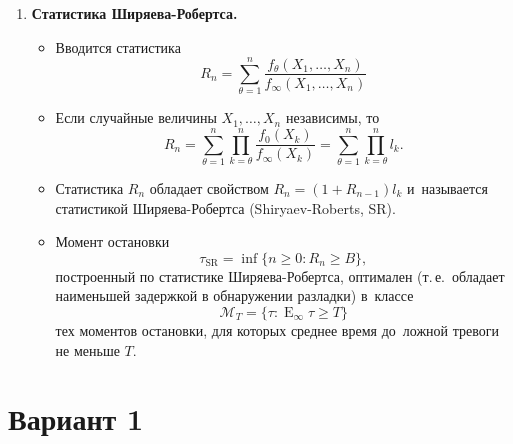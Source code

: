 \documentclass[a4paper,14pt]{extreport}
\renewcommand{\=}[1]{\stackrel{#1}{=}} %
\newcommand{\Expect}{\mathop{{}\mathrm{E}}}
\newenvironment{boenumerate}
  {\begin{enumerate}\renewcommand\labelenumi{\textbf{\theenumi.}}}
  {\end{enumerate}}
\begin{document}
\begin{boenumerate}
    \item \textbf{Статистика Ширяева-Робертса.}
    \begin{itemize}
    \item Вводится статистика
    \begin{equation*}
    R_n = \sum\limits_{\theta = 1}^{n} \frac{f_{\theta}(X_1, \ldots, X_n)}{f_{\infty}(X_1, \ldots, X_n)}
    \end{equation*}
    \item Если случайные величины $X_1, \ldots, X_n$ независимы, то
    \begin{equation*}
    R_n = \sum\limits_{\theta = 1}^{n} \prod\limits_{k=\theta}^{n}
        \frac{f_{0}(X_k)}{f_{\infty}(X_k)} =
            \sum\limits_{\theta = 1}^{n} \prod\limits_{k=\theta}^{n}
        l_k.
    \end{equation*}
    \item Статистика $R_n$ обладает свойством $R_n = (1 + R_{n-1}) l_k$
    и~называется статистикой Ширяева-Робертса (Shiryaev-Roberts, SR).
    \item Момент остановки 
    \begin{equation*}
    \tau_{\mathrm{SR}} = \inf \{n \geqslant 0: R_n \geqslant B\},
    \end{equation*}
    построенный по статистике Ширяева-Робертса,
    оптимален (т.\,е.~обладает наименьшей задержкой
    в обнаружении разладки) в~классе
    \[
    \mathcal{M}_T = \{\tau : 
        {\textstyle \Expect_{\infty}} \tau \geqslant T\}
    \]
    тех моментов остановки, для которых среднее время
    до~ложной тревоги не меньше $T$.
    \end{itemize}


\end{boenumerate}


\newpage


\section*{Вариант 1}
\end{document}
